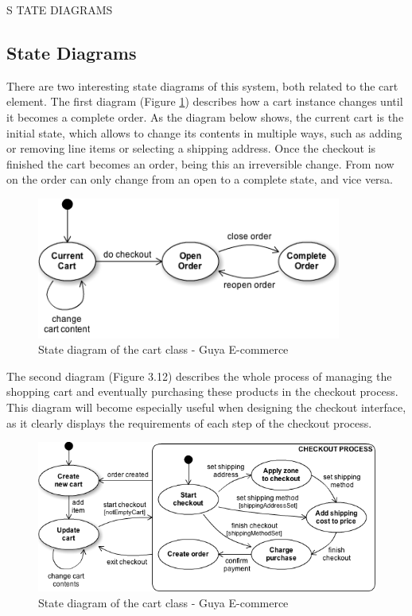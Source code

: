 \clearpage

S TATE	
  DIAGRAMS 	
  
\subsection{State Diagrams}
There are two interesting state diagrams of this system, both related to the cart element. The first diagram (Figure \ref{cart-state-diagram}) describes how a cart instance changes until it becomes a complete order. As the diagram below shows, the current cart is the initial state, which allows to change its contents in multiple ways, such as adding or removing line items or selecting a shipping address. Once the checkout is finished the cart becomes an order, being this an irreversible change. From now on the order can only change from an open to a complete state, and vice versa.

\begin{figure}[!h]
\center
\includegraphics[keepaspectratio, width=10cm]{state-diagrams/cart-state-diagram.png}
\caption{State diagram of the cart class - Guya E-commerce}
\label{cart-state-diagram}
\end{figure}

The second diagram (Figure 3.12) describes the whole process of managing the shopping cart and eventually purchasing these products in the checkout process. This diagram will become especially useful when designing the checkout interface, as it clearly displays the requirements of each step of the checkout process.

\begin{figure}[!h]
\center
\includegraphics[keepaspectratio, width=15cm]{state-diagrams/purchasing-product-state-diagram.png}
\caption{State diagram of the cart class - Guya E-commerce}
\label{purchasing-product-state-diagram}
\end{figure}

